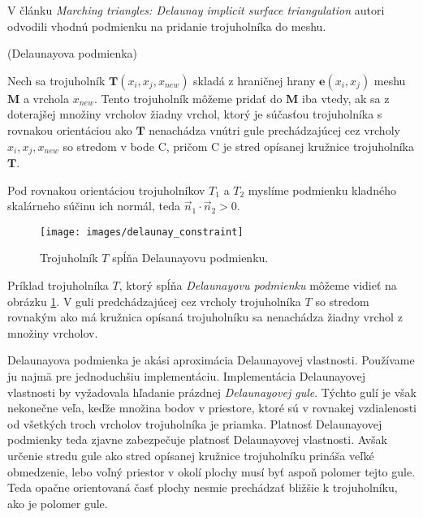 V článku \textit{Marching triangles: Delaunay implicit surface triangulation} \cite{hilton1997marching}
autori odvodili vhodnú podmienku na pridanie trojuholníka do meshu.

\begin{definition}
    (Delaunayova podmienka)
    \label{def:delaunay_constraint}

    Nech sa trojuholník $\mathbf{T}(x_i, x_j, x_{new})$ skladá z hraničnej hrany $\mathbf{e}(x_i, x_j)$ 
    meshu $\mathbf{M}$ a vrchola $x_{new}$. Tento trojuholník môžeme pridať do 
    $\mathbf{M}$ iba vtedy, ak sa z doterajšej 
    množiny vrcholov žiadny vrchol, ktorý je súčasťou trojuholníka s rovnakou orientáciou ako 
    $\mathbf{T}$ nenachádza vnútri gule prechádzajúcej cez vrcholy $x_i, x_j, x_{new}$ so stredom 
    v bode C, pričom C je stred opísanej kružnice trojuholníka $\mathbf{T}$.
\end{definition}

    Pod rovnakou orientáciou 
    trojuholníkov $T_1$ a $T_2$ myslíme podmienku kladného skalárneho súčinu ich normál, teda 
    $\vec{n}_1 \cdot \vec{n}_2 > 0$.

\begin{figure}
    \centerline{\texttt{[image: images/delaunay\_constraint]}}
    \caption[Trojuholník $T$ spĺňajúci Delaunayovu podmienku]
    {\cite{hilton1996marching} Trojuholník $T$ spĺňa Delaunayovu podmienku.}
    \label{obr:delaunay_constraint}
\end{figure}

Príklad trojuholníka $T$, ktorý spĺňa \textit{Delaunayovu podmienku} môžeme vidieť na obrázku 
\ref{obr:delaunay_constraint}. V guli predchádzajúcej cez vrcholy trojuholníka $T$ so stredom 
rovnakým ako má kružnica opísaná trojuholníku sa nenachádza žiadny vrchol z množiny vrcholov.

Delaunayova podmienka je akási aproximácia Delaunayovej vlastnosti. Používame ju najmä pre jednoduchšiu
implementáciu. Implementácia Delaunayovej vlastnosti by vyžadovala
hľadanie prázdnej \textit{Delaunayovej gule}. Týchto gulí je však nekonečne veľa, keďže množina
bodov v priestore, ktoré sú v rovnakej vzdialenosti od všetkých troch vrcholov trojuholníka je priamka.
Platnosť Delaunayovej podmienky teda zjavne zabezpečuje platnosť Delaunayovej vlastnosti.
Avšak určenie stredu gule ako stred opísanej kružnice trojuholníku prináša veľké obmedzenie,
lebo voľný priestor v okolí plochy musí byť aspoň polomer tejto gule. Teda opačne orientovaná
časť plochy nesmie prechádzať bližšie k trojuholníku, ako je polomer gule.


